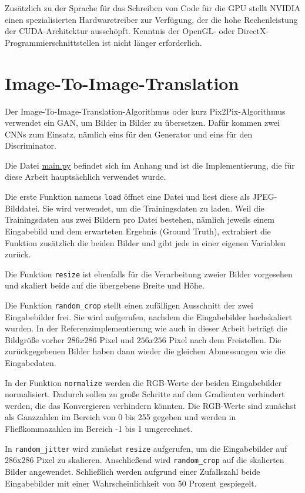 Zusätzlich zu der Sprache für das Schreiben von Code für die GPU stellt NVIDIA einen spezialisierten Hardwaretreiber zur Verfügung, der die hohe Rechenleistung der CUDA-Architektur ausschöpft. Kenntnis der OpenGL- oder DirectX-Programmierschnittstellen ist nicht länger erforderlich. \cite{sanders2010cuda}

\section{Image-To-Image-Translation}
\label{sec:pix2pix}
Der Image-To-Image-Translation-Algorithmus oder kurz Pix2Pix-Algorithmus verwendet ein GAN, um Bilder in Bilder zu übersetzen. Dafür kommen zwei CNNs zum Einsatz, nämlich eins für den Generator und eins für den Discriminator. \cite{isola2018imagetoimage}

Die Datei \hyperref[pix2pixpy]{main.py} befindet sich im Anhang und ist die Implementierung, die für diese Arbeit hauptsächlich verwendet wurde.

Die erste Funktion namens \lstinline|load| öffnet eine Datei und liest diese als JPEG-Bilddatei. Sie wird verwendet, um die Trainingsdaten zu laden. Weil die Trainingsdaten aus zwei Bildern pro Datei bestehen, nämlich jeweils einem Eingabebild und dem erwarteten Ergebnis (Ground Truth), extrahiert die Funktion zusätzlich die beiden Bilder und gibt jede in einer eigenen Variablen zurück.

Die Funktion \lstinline|resize| ist ebenfalls für die Verarbeitung zweier Bilder vorgesehen und skaliert beide auf die übergebene Breite und Höhe.

Die Funktion \lstinline|random_crop| stellt einen zufälligen Ausschnitt der zwei Eingabebilder frei. Sie wird aufgerufen, nachdem die Eingabebilder hochskaliert wurden. In der Referenzimplementierung wie auch in dieser Arbeit beträgt die Bildgröße vorher $286x286$ Pixel und $256x256$ Pixel nach dem Freistellen. Die zurückgegebenen Bilder haben dann wieder die gleichen Abmessungen wie die Eingabedaten.

In der Funktion \lstinline|normalize| werden die RGB-Werte der beiden Eingabebilder normalisiert. Dadurch sollen zu große Schritte auf dem Gradienten verhindert werden, die das Konvergieren verhindern könnten. \cite{chollet2021deep} Die RGB-Werte sind zunächst als Ganzzahlen im Bereich von 0 bis 255 gegeben und werden in Fließkommazahlen im Bereich -1 bis 1 umgerechnet.

In \lstinline|random_jitter| wird zunächst \lstinline|resize| aufgerufen, um die Eingabebilder auf 286x286 Pixel zu skalieren. Anschließend wird \lstinline|random_crop| auf die skalierten Bilder angewendet. Schließlich werden aufgrund einer Zufallszahl beide Eingabebilder mit einer Wahrscheinlichkeit von 50 Prozent gespiegelt.

